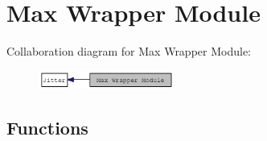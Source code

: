 \hypertarget{group__maxwrapmod}{
\section{Max Wrapper Module}
\label{group__maxwrapmod}
}


Collaboration diagram for Max Wrapper Module:\nopagebreak
\begin{figure}[H]
\begin{center}
\leavevmode
\includegraphics[width=126pt]{group__maxwrapmod}
\end{center}
\end{figure}
\subsection*{Functions}
